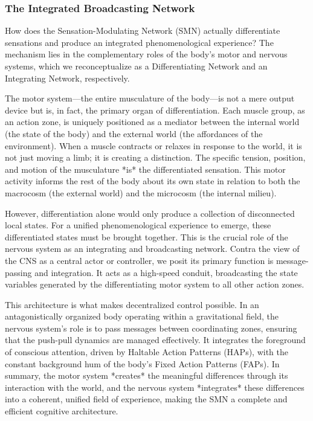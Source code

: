 \subsubsection*{The Integrated Broadcasting Network}
How does the Sensation-Modulating Network (SMN) actually differentiate sensations and produce an integrated phenomenological experience? The mechanism lies in the complementary roles of the body's motor and nervous systems, which we reconceptualize as a Differentiating Network and an Integrating Network, respectively.

The motor system—the entire musculature of the body—is not a mere output device but is, in fact, the primary organ of differentiation. Each muscle group, as an action zone, is uniquely positioned as a mediator between the internal world (the state of the body) and the external world (the affordances of the environment). When a muscle contracts or relaxes in response to the world, it is not just moving a limb; it is creating a distinction. The specific tension, position, and motion of the musculature *is* the differentiated sensation. This motor activity informs the rest of the body about its own state in relation to both the macrocosm (the external world) and the microcosm (the internal milieu).

However, differentiation alone would only produce a collection of disconnected local states. For a unified phenomenological experience to emerge, these differentiated states must be brought together. This is the crucial role of the nervous system as an integrating and broadcasting network. Contra the view of the CNS as a central actor or controller, we posit its primary function is message-passing and integration. It acts as a high-speed conduit, broadcasting the state variables generated by the differentiating motor system to all other action zones.

This architecture is what makes decentralized control possible. In an antagonistically organized body operating within a gravitational field, the nervous system's role is to pass messages between coordinating zones, ensuring that the push-pull dynamics are managed effectively. It integrates the foreground of conscious attention, driven by Haltable Action Patterns (HAPs), with the constant background hum of the body's Fixed Action Patterns (FAPs). In summary, the motor system *creates* the meaningful differences through its interaction with the world, and the nervous system *integrates* these differences into a coherent, unified field of experience, making the SMN a complete and efficient cognitive architecture.
